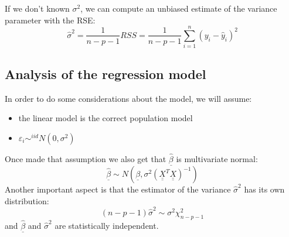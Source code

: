 If we don't known $\sigma^2$, we can compute an unbiased estimate of the variance parameter with the RSE:
\[
    \hat{\sigma}^2 = \frac{1}{n-p-1} RSS = \frac{1}{n-p-1} \sum_{i=1}^{n} (y_i -\hat{y}_i)^2
\]

\subsection*{Analysis of the regression model}
In order to do some considerations about the model, we will assume:
\begin{itemize}
    \item the linear model is the correct population model
    \item $\varepsilon_i \sim^{iid} N(0,\sigma^2)$
\end{itemize}

Once made that assumption we also get that $\hat{\underline\beta}$ is multivariate normal:
\[
    \hat{\underline\beta} \sim N(\underline\beta, \sigma^2 (\underline {\underline X}^T \underline {\underline X})^{-1})
\]
Another important aspect is that the estimator of the variance $\hat{\sigma}^2$ has its own distribution:
\[
    (n-p-1) \hat{\sigma}^2 \sim \sigma^2 \chi^2_{n-p-1}
\]
and $\hat{\underline\beta}$ and $\hat{\sigma}^2$ are statistically independent.


